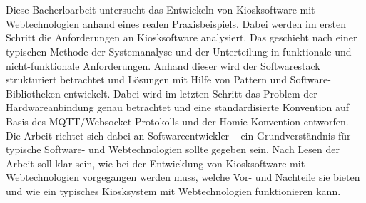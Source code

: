 \chapter{\abstractname}

Diese Bacherloarbeit untersucht das Entwickeln von Kiosksoftware mit Webtechnologien
anhand eines realen Praxisbeispiels. Dabei werden im ersten Schritt die Anforderungen
an Kiosksoftware analysiert. Das geschieht nach einer typischen Methode der Systemanalyse
und der Unterteilung in funktionale und nicht-funktionale Anforderungen. Anhand dieser
wird der Softwarestack strukturiert betrachtet und Lösungen mit Hilfe von Pattern und 
Software-Bibliotheken entwickelt. Dabei wird im letzten Schritt das Problem der
Hardwareanbindung genau betrachtet und eine standardisierte Konvention auf
Basis des MQTT/Websocket Protokolls und der Homie Konvention entworfen.\\
Die Arbeit richtet sich dabei an Softwareentwickler -- ein Grundverständnis für typische 
Software- und Webtechnologien sollte gegeben sein. Nach Lesen der Arbeit soll klar sein,
wie bei der Entwicklung von Kiosksoftware mit Webtechnologien vorgegangen werden muss, welche
Vor- und Nachteile sie bieten und wie ein typisches Kiosksystem mit Webtechnologien funktionieren
kann. \\

\iffalse
- wie typische Anforderungen an Kiosksoftware mit Webtechnologien erfüllt werden können
- zum Beispiel Offline Verfügbarkeit und Geschlosssenheit 
\fi


